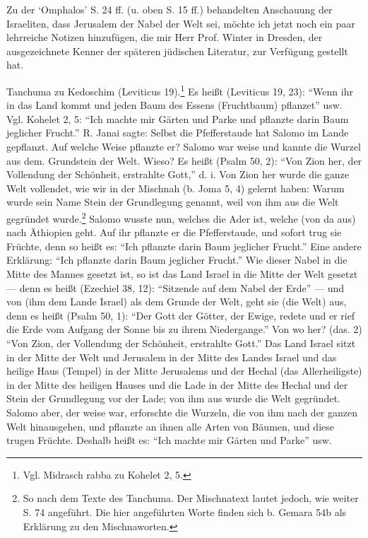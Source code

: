 \documentclass[a4paper, 11pt, oneside]{article}
\begin{document}
Zu der `Omphalos' S. 24 ff. (u. oben S. 15 ff.) behandelten Anschauung der Israeliten, dass Jerusalem der Nabel der Welt sei, möchte ich jetzt noch ein paar lehrreiche Notizen hinzufügen, die mir Herr Prof. Winter in Dresden, der ausgezeichnete Kenner der späteren jüdischen Literatur, zur Verfügung gestellt hat.

Tanchuma zu Kedoschim (Leviticus 19).\footnote{Vgl. Midrasch rabba zu Kohelet 2, 5.} Es heißt (Leviticus 19, 23): "`Wenn ihr in das Land kommt und jeden Baum des Essens (Fruchtbaum) pflanzet"' usw. Vgl. Kohelet 2, 5: "`Ich machte mir Gärten und Parke und pflanzte darin Baum jeglicher Frucht."' R. Janai sagte: Selbst die Pfefferstaude hat Salomo im Lande gepflanzt. Auf welche Weise pflanzte er? Salomo war weise und kannte die Wurzel aus dem. Grundstein der Welt. Wieso? Es heißt (Psalm 50, 2): "`Von Zion her, der Vollendung der Schönheit, erstrahlte Gott,"' d. i. Von Zion her wurde die ganze Welt vollendet, wie wir in der Mischnah (b. Joma 5, 4) gelernt haben: Warum wurde sein Name Stein der Grundlegung genannt, weil von ihm aus die Welt gegründet wurde.\footnote{So nach dem Texte des Tanchuma. Der Mischnatext lautet jedoch, wie weiter S. 74 angeführt. Die hier angeführten Worte finden sich b. Gemara 54b als Erklärung zu den Mischnaworten.} Salomo wusste nun, welches die Ader ist, welche (von da aus) nach Äthiopien geht. Auf ihr pflanzte er die Pfefferstaude, und sofort trug sie Früchte, denn so heißt es: "`Ich pflanzte darin Baum jeglicher Frucht."' Eine andere Erklärung: "`Ich pflanzte darin Baum jeglicher Frucht."' Wie dieser Nabel in die Mitte des Mannes gesetzt ist, so ist das Land Israel in die Mitte der Welt gesetzt --- denn es heißt (Ezechiel 38, 12): "`Sitzende auf dem Nabel der Erde"' --- und von (ihm dem Lande Israel) als dem Grunde der Welt, geht sie (die Welt) aus, denn es heißt (Psalm 50, 1): "`Der Gott der Götter, der Ewige, redete und er rief die Erde vom Aufgang der Sonne bis zu ihrem Niedergange."' Von wo her? (das. 2) "`Von Zion, der Vollendung der Schönheit, erstrahlte Gott."' Das Land Israel sitzt in der Mitte der Welt und Jerusalem in der Mitte des Landes Israel und das heilige Haus (Tempel) in der Mitte Jerusalems und der Hechal (das Allerheiligste) in der Mitte des heiligen Hauses und die Lade in der Mitte des Hechal und der Stein der Grundlegung vor der Lade; von ihm aus wurde die Welt gegründet. Salomo aber, der weise war, erforschte die Wurzeln, die von ihm nach der ganzen Welt hinausgehen, und pflanzte an ihnen alle Arten von Bäumen, und diese trugen Früchte. Deshalb heißt es: "`Ich machte mir Gärten und Parke"' usw.
\end{document}
